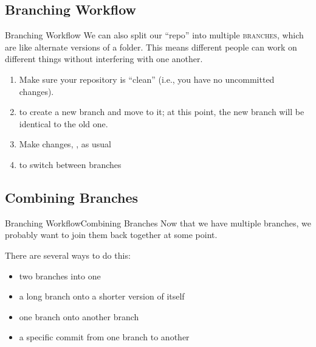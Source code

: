 \subsection{Branching Workflow}
\begin{frame}{Branching Workflow}
  We can also split our \enquote{repo} into multiple \textsc{branches}, which
  are like alternate versions of a folder.  This means different people can
  work on different things without interfering with one another.
  \pause
  \begin{enumerate}
    \item Make sure your repository is \enquote{clean} (i.e., you have no uncommitted changes).
      \pause
    \item {} to create a new branch and move to it;
      at this point, the new branch will be identical to the old one.
    \item Make changes, ,  as usual
    \item {} to switch between branches
  \end{enumerate}
\end{frame}

\subsection{Combining Branches}
\begin{frame}{Branching Workflow}{Combining Branches}
  Now that we have multiple branches, we probably want to join them back
  together at some point.

  There are several ways to do this:
  \begin{itemize}
    \item {} two branches into one
    \item {} a long branch onto a shorter version
      of itself
    \item {} one branch onto another branch
    \item {} a specific commit from one branch to another
  \end{itemize}
\end{frame}

